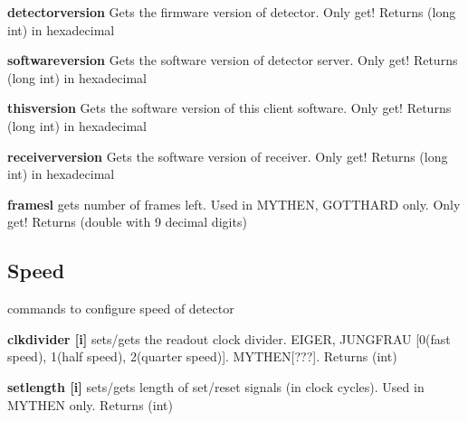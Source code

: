\begin{DoxyItemize}
\item {\bfseries detectorversion} Gets the firmware version of detector. Only get! {\ttfamily Returns} {\ttfamily }(long int) in hexadecimal
\end{DoxyItemize}


\begin{DoxyItemize}
\item {\bfseries softwareversion} Gets the software version of detector server. Only get! {\ttfamily Returns} {\ttfamily }(long int) in hexadecimal
\end{DoxyItemize}


\begin{DoxyItemize}
\item {\bfseries thisversion} Gets the software version of this client software. Only get! {\ttfamily Returns} {\ttfamily }(long int) in hexadecimal
\end{DoxyItemize}


\begin{DoxyItemize}
\item {\bfseries receiverversion} Gets the software version of receiver. Only get! {\ttfamily Returns} {\ttfamily }(long int) in hexadecimal
\end{DoxyItemize}


\begin{DoxyItemize}
\item {\bfseries framesl} gets number of frames left. Used in MYTHEN, GOTTHARD only. Only get! {\ttfamily Returns} {\ttfamily }(double with 9 decimal digits)
\end{DoxyItemize}\hypertarget{config_configspeed}{}\subsection{Speed}\label{config_configspeed}
commands to configure speed of detector


\begin{DoxyItemize}
\item {\bfseries clkdivider \mbox{[}i\mbox{]}} sets/gets the readout clock divider. EIGER, JUNGFRAU \mbox{[}0(fast speed), 1(half speed), 2(quarter speed)\mbox{]}. MYTHEN\mbox{[}???\mbox{]}. {\ttfamily Returns} {\ttfamily }(int)
\end{DoxyItemize}


\begin{DoxyItemize}
\item {\bfseries setlength \mbox{[}i\mbox{]}} sets/gets length of set/reset signals (in clock cycles). Used in MYTHEN only. {\ttfamily Returns} {\ttfamily }(int)
\end{DoxyItemize}


